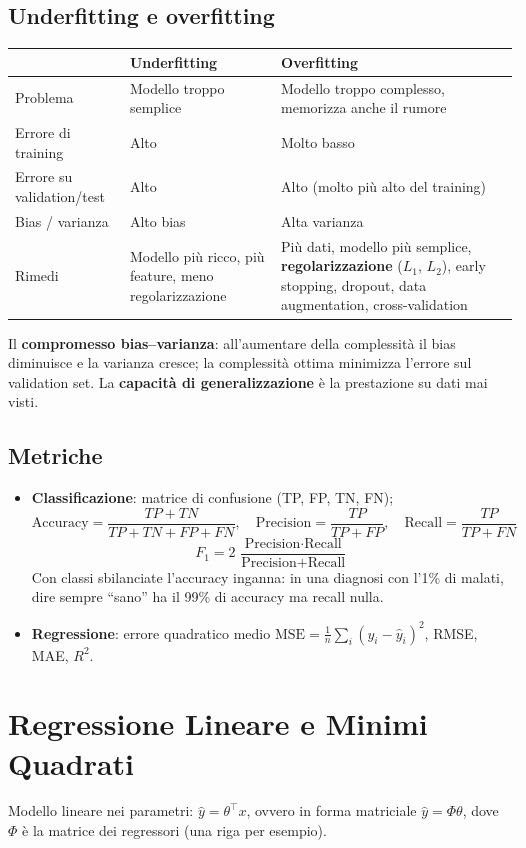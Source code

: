 \subsection{Underfitting e overfitting}
\begin{center}
\begin{tabularx}{\textwidth}{@{}lXX@{}}
\toprule
 & \textbf{Underfitting} & \textbf{Overfitting} \\
\midrule
Problema & Modello troppo semplice & Modello troppo complesso, memorizza anche il rumore \\
Errore di training & Alto & Molto basso \\
Errore su validation/test & Alto & Alto (molto più alto del training) \\
Bias / varianza & Alto bias & Alta varianza \\
Rimedi & Modello più ricco, più feature, meno regolarizzazione & Più dati, modello più semplice, \textbf{regolarizzazione} ($L_1$, $L_2$), early stopping, dropout, data augmentation, cross-validation \\
\bottomrule
\end{tabularx}
\end{center}

Il \textbf{compromesso bias--varianza}: all'aumentare della complessità il bias diminuisce e la varianza cresce; la complessità ottima minimizza l'errore sul validation set. La \textbf{capacità di generalizzazione} è la prestazione su dati mai visti.

\subsection{Metriche}
\begin{itemize}
    \item \textbf{Classificazione}: matrice di confusione (TP, FP, TN, FN);
    \[
    \text{Accuracy} = \frac{TP+TN}{TP+TN+FP+FN},\quad
    \text{Precision} = \frac{TP}{TP+FP},\quad
    \text{Recall} = \frac{TP}{TP+FN}
    \]
    \[
    F_1 = 2\,\frac{\text{Precision}\cdot\text{Recall}}{\text{Precision}+\text{Recall}}
    \]
    Con classi sbilanciate l'accuracy inganna: in una diagnosi con l'1\% di malati, dire sempre ``sano'' ha il 99\% di accuracy ma recall nulla.
    \item \textbf{Regressione}: errore quadratico medio $\mathrm{MSE} = \frac{1}{n}\sum_i (y_i-\hat y_i)^2$, RMSE, MAE, $R^2$.
\end{itemize}

\section{Regressione Lineare e Minimi Quadrati}
Modello lineare nei parametri: $\hat y = \theta^\top x$, ovvero in forma matriciale $\hat y = \Phi\theta$, dove $\Phi$ è la matrice dei regressori (una riga per esempio).


